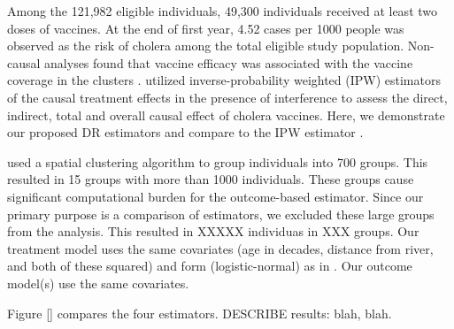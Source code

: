 \documentclass[oupdraft]{biostatistics}
\begin{document}
Among the 121,982 eligible individuals, 49,300 individuals received at least two doses of vaccines. At the end of first year, 4.52 cases per 1000 people was observed as the risk of cholera among the total eligible study population. Non-causal analyses found that vaccine efficacy was associated with the vaccine coverage in the clusters \citep{ali2005herd,root2011role}. \citet{PerezHeydrich2014interference} utilized inverse-probability weighted (IPW) estimators of the causal treatment effects in the presence of interference to assess the direct, indirect, total and overall causal effect of cholera vaccines. Here, we demonstrate our proposed DR estimators and compare to the IPW estimator \citet{PerezHeydrich2014interference}.

\citet{PerezHeydrich2014interference} used a spatial clustering algorithm to group individuals into 700 groups. This resulted in 15 groups with more than 1000 individuals. These groups cause significant computational burden for the outcome-based estimator. Since our primary purpose is a comparison of estimators, we excluded these large groups from the analysis. This resulted in XXXXX individuas in XXX groups. Our treatment model uses the same covariates (age in decades, distance from river, and both of these squared) and form (logistic-normal) as in \citet{PerezHeydrich2014interference}. Our outcome model(s) use the same covariates.

Figure \ref{} compares the four estimators. DESCRIBE results: blah, blah. 

\end{document}
